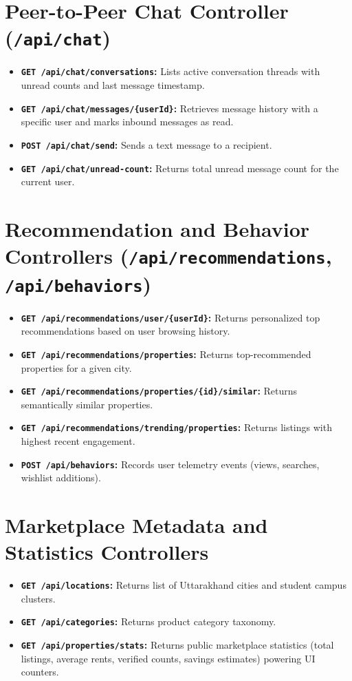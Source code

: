 \section{Peer-to-Peer Chat Controller (\texttt{/api/chat})}
\begin{itemize}
    \item \textbf{\texttt{GET /api/chat/conversations}:} Lists active conversation threads with unread counts and last message timestamp.
    \item \textbf{\texttt{GET /api/chat/messages/\{userId\}}:} Retrieves message history with a specific user and marks inbound messages as read.
    \item \textbf{\texttt{POST /api/chat/send}:} Sends a text message to a recipient.
    \item \textbf{\texttt{GET /api/chat/unread-count}:} Returns total unread message count for the current user.
\end{itemize}

\section{Recommendation and Behavior Controllers (\texttt{/api/recommendations}, \texttt{/api/behaviors})}
\begin{itemize}
    \item \textbf{\texttt{GET /api/recommendations/user/\{userId\}}:} Returns personalized top recommendations based on user browsing history.
    \item \textbf{\texttt{GET /api/recommendations/properties}:} Returns top-recommended properties for a given city.
    \item \textbf{\texttt{GET /api/recommendations/properties/\{id\}/similar}:} Returns semantically similar properties.
    \item \textbf{\texttt{GET /api/recommendations/trending/properties}:} Returns listings with highest recent engagement.
    \item \textbf{\texttt{POST /api/behaviors}:} Records user telemetry events (views, searches, wishlist additions).
\end{itemize}

\section{Marketplace Metadata and Statistics Controllers}
\begin{itemize}
    \item \textbf{\texttt{GET /api/locations}:} Returns list of Uttarakhand cities and student campus clusters.
    \item \textbf{\texttt{GET /api/categories}:} Returns product category taxonomy.
    \item \textbf{\texttt{GET /api/properties/stats}:} Returns public marketplace statistics (total listings, average rents, verified counts, savings estimates) powering UI counters.
\end{itemize}

